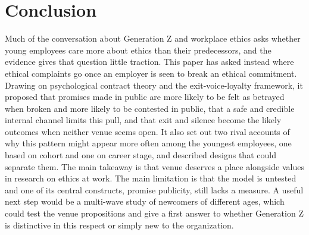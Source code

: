 \section{Conclusion}
Much of the conversation about Generation Z and workplace ethics asks whether young employees care more about ethics than their predecessors, and the evidence gives that question little traction. This paper has asked instead where ethical complaints go once an employer is seen to break an ethical commitment. Drawing on psychological contract theory and the exit-voice-loyalty framework, it proposed that promises made in public are more likely to be felt as betrayed when broken and more likely to be contested in public, that a safe and credible internal channel limits this pull, and that exit and silence become the likely outcomes when neither venue seems open. It also set out two rival accounts of why this pattern might appear more often among the youngest employees, one based on cohort and one on career stage, and described designs that could separate them. The main takeaway is that venue deserves a place alongside values in research on ethics at work. The main limitation is that the model is untested and one of its central constructs, promise publicity, still lacks a measure. A useful next step would be a multi-wave study of newcomers of different ages, which could test the venue propositions and give a first answer to whether Generation Z is distinctive in this respect or simply new to the organization.
